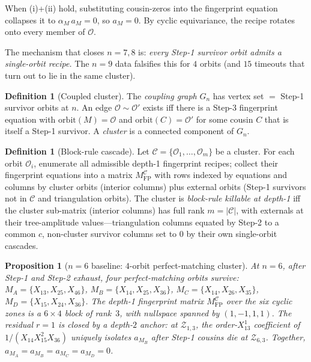 \documentclass[11pt]{article}
\newtheorem{prop}[thm]{Proposition}
\theoremstyle{definition}
\newtheorem{defn}[thm]{Definition}
\begin{document}
When (i)+(ii) hold, substituting cousin-zeros into the fingerprint
equation collapses it to $\alpha_M\,a_M=0$, so $a_M=0$. By cyclic
equivariance, the recipe rotates onto every member of $\mathcal O$.

The mechanism that closes $n=7,8$ is:
\emph{every Step-1 survivor orbit admits a single-orbit recipe.}
The $n=9$ data falsifies this for $4$ orbits (and $15$ timeouts that
turn out to lie in the same cluster).

\begin{defn}[Coupled cluster]
The \emph{coupling graph} $G_n$ has vertex set $=$ Step-1 survivor
orbits at $n$. An edge $\mathcal O \sim \mathcal O'$ exists iff
there is a Step-3 fingerprint equation with $\mathrm{orbit}(M)
=\mathcal O$ and $\mathrm{orbit}(C)=\mathcal O'$ for some cousin
$C$ that is itself a Step-1 survivor. A \emph{cluster} is a connected
component of $G_n$.
\end{defn}

\begin{defn}[Block-rule cascade]\label{def:block-rule}
Let $\mathcal C=\{\mathcal O_1,\dots,\mathcal O_m\}$ be a cluster.
For each orbit $\mathcal O_i$, enumerate all admissible depth-1
fingerprint recipes; collect their fingerprint equations into a
matrix $M_{\mathrm{FP}}^{\mathcal C}$ with rows indexed by equations
and columns by cluster orbits (interior columns) plus external
orbits (Step-1 survivors not in $\mathcal C$ and triangulation
orbits). The cluster is \emph{block-rule killable at depth-1} iff
the cluster sub-matrix (interior columns) has full rank
$m=|\mathcal C|$, with externals at their tree-amplitude
values---triangulation columns equated by Step-2 to a common $c$,
non-cluster survivor columns set to $0$ by their own single-orbit
cascades.
\end{defn}

\begin{prop}[$n=6$ baseline: $4$-orbit perfect-matching cluster]\label{prop:n6}
At $n=6$, after Step-1 and Step-2 exhaust, four perfect-matching
orbits survive:
$M_A=\{X_{13},X_{25},X_{46}\}$,
$M_B=\{X_{14},X_{25},X_{36}\}$,
$M_C=\{X_{14},X_{26},X_{35}\}$,
$M_D=\{X_{15},X_{24},X_{36}\}$.
The depth-1 fingerprint matrix $M_{\mathrm{FP}}^{\mathcal C}$ over
the six cyclic zones is a $6\times 4$ block of rank~$3$, with
nullspace spanned by $(1,-1,1,1)$. The residual $r=1$ is closed by
a depth-$2$ anchor: at $\mathcal Z_{1,3}$, the order-$X_{13}^1$
coefficient of $1/(X_{14}X_{15}^2X_{36})$ uniquely isolates
$a_{M_B}$ after Step-1 cousins die at $\mathcal Z_{6,3}$. Together,
$a_{M_A}=a_{M_B}=a_{M_C}=a_{M_D}=0$.
\end{prop}
\end{document}
